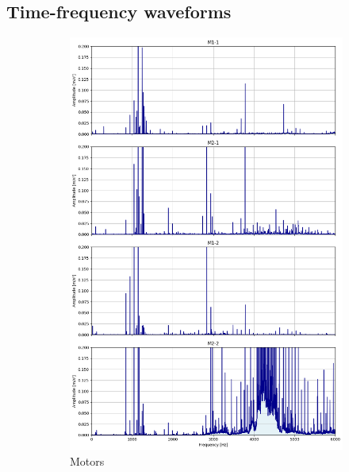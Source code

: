 \subsection{Time-frequency waveforms}
\begin{figure}[h]
    \centering
    \begin{subfigure}[b]{0.32\textwidth}
        \includegraphics[width=\textwidth]{assets/results/eda/frequency-spectrum-motors.png}
        \caption{Motors}
    \end{subfigure}
    \hfill
    \begin{subfigure}[b]{0.32\textwidth}

\end{subfigure}
\end{figure}
